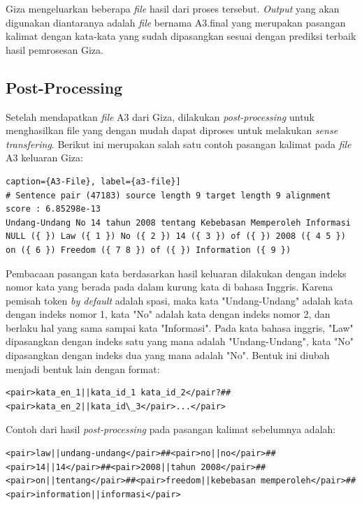 Giza mengeluarkan beberapa \textit{file} hasil dari proses tersebut. \textit{Output} yang akan digunakan diantaranya adalah \textit{file} bernama A3.final yang merupakan pasangan kalimat dengan kata-kata yang sudah dipasangkan sesuai dengan prediksi terbaik hasil pemrosesan Giza.

\subsection{Post-Processing}
Setelah mendapatkan \textit{file} A3 dari Giza, dilakukan \textit{post-processing} untuk menghasilkan file yang dengan mudah dapat diproses untuk melakukan \textit{sense transfering}. Berikut ini merupakan salah satu contoh pasangan kalimat pada \textit{file} A3 keluaran Giza:

\begin{lstlisting}caption={A3-File}, label={a3-file}]
# Sentence pair (47183) source length 9 target length 9 alignment score : 6.85298e-13
Undang-Undang No 14 tahun 2008 tentang Kebebasan Memperoleh Informasi 
NULL ({ }) Law ({ 1 }) No ({ 2 }) 14 ({ 3 }) of ({ }) 2008 ({ 4 5 }) on ({ 6 }) Freedom ({ 7 8 }) of ({ }) Information ({ 9 })
\end{lstlisting}

Pembacaan pasangan kata berdasarkan hasil keluaran dilakukan dengan indeks nomor kata yang berada pada dalam kurung kata di bahasa Inggris. Karena pemisah token \textit{by default} adalah spasi, maka kata "Undang-Undang" adalah kata dengan indeks nomor 1, kata "No" adalah kata dengan indeks nomor 2, dan berlaku hal yang sama sampai kata "Informasi". Pada kata bahasa inggris, "Law" dipasangkan dengan indeks satu yang mana adalah "Undang-Undang", kata "No" dipasangkan dengan indeks dua yang mana adalah "No". Bentuk ini diubah menjadi bentuk lain dengan format:

\begin{lstlisting}
<pair>kata_en_1||kata_id_1 kata_id_2</pair?##<pair>kata_en_2||kata_id\_3</pair>...</pair>
\end{lstlisting}

Contoh dari hasil \textit{post-processing} pada pasangan kalimat sebelumnya adalah:

\begin{lstlisting}
<pair>law||undang-undang</pair>##<pair>no||no</pair>##<pair>14||14</pair>##<pair>2008||tahun 2008</pair>##<pair>on||tentang</pair>##<pair>freedom||kebebasan memperoleh</pair>##<pair>information||informasi</pair>
\end{lstlisting}

